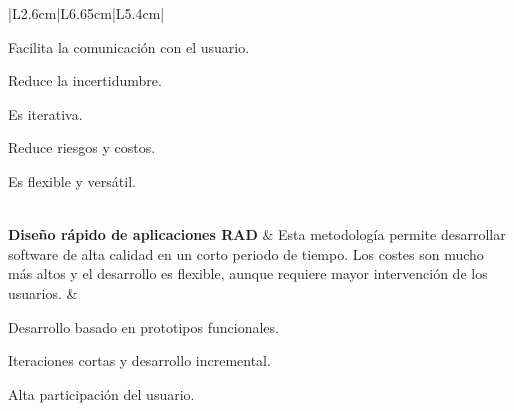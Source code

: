 {\begin{longtable}{|L{2.6cm}|L{6.65cm}|L{5.4cm}|}
\begin{tablista}
  \item Facilita la comunicación con el usuario.
  \item Reduce la incertidumbre.
  \item Es iterativa.
  \item Reduce riesgos y costos.
  \item Es flexible y versátil.
\end{tablista} \\
\hline
\textbf{Diseño rápido de aplicaciones RAD} & Esta metodología permite
desarrollar software de alta calidad en un corto periodo de tiempo. Los costes
son mucho más altos y el desarrollo es flexible, aunque requiere mayor
intervención de los usuarios. &
\begin{tablista}
  \item Desarrollo basado en prototipos funcionales.
  \item Iteraciones cortas y desarrollo incremental.
  \item Alta participación del usuario.
\end{tablista} \\ \hline
\caption[Comparación de Metodologías tradicionales de desarrollo de software]{Comparación de Metodologías tradicionales de desarrollo de software. \textit{Fuente:} Elaboración propia.}\label{tab:metodologias-tradicionales}\\
\end{longtable}
}




